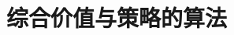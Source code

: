 \setcounter{chapter}{12}

\hypertarget{ux7efcux5408ux4ef7ux503cux4e0eux7b56ux7565ux7684ux7b97ux6cd5}{%
\chapter{综合价值与策略的算法}\label{ux7efcux5408ux4ef7ux503cux4e0eux7b56ux7565ux7684ux7b97ux6cd5}}
